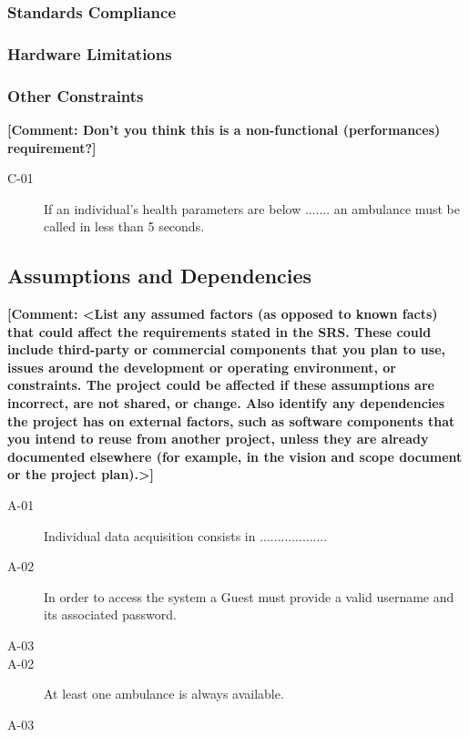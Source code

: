 \documentclass[a4paper]{article}
\newcommand{\comment}[1]{\textbf{[Comment: #1]}}
\begin{document}
        \subsubsection{Standards Compliance}
        
        \subsubsection{Hardware Limitations}
        
        \subsubsection{Other Constraints}
        
    \comment{Don't you think this is a non-functional (performances) requirement?}
    \begin{description}
        \item[C-01] If an individual's health parameters are below ....... an ambulance must be called in less than 5 seconds.
    \end{description}
    
    \subsection{Assumptions and Dependencies}
    \comment{<List any assumed factors (as opposed to known facts) that could affect the requirements stated in the SRS. These could include third-party or commercial components that you plan to use, issues around the development or operating environment, or constraints. The project could be affected if these assumptions are incorrect, are not shared, or change. Also identify any dependencies the project has on external factors, such as software components that you intend to reuse from another project, unless they are already documented elsewhere (for example, in the vision and scope document or the project plan).>}

        \begin{description}
        \item[A-01] Individual data acquisition consists in ...................
        \item[A-02] In order to access the system a Guest must provide a valid username and its associated password.
        \item[A-03]
        \item[A-02] At least one ambulance is always available.
        \item[A-03]
    \end{description}
    
\end{document}
